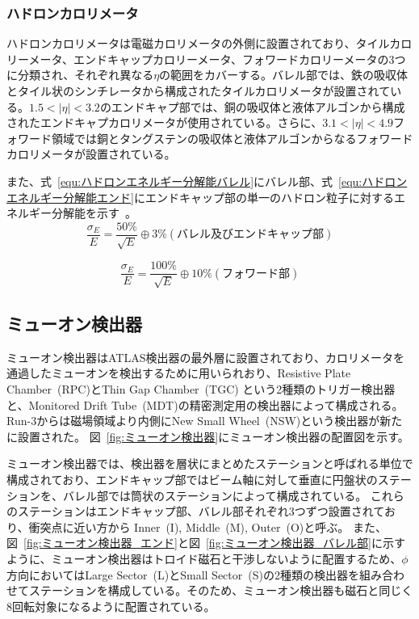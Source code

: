 \subsubsection{ハドロンカロリメータ}
ハドロンカロリメータは電磁カロリメータの外側に設置されており、タイルカロリーメータ、エンドキャップカロリーメータ、フォワードカロリーメータの3つに分類され、それぞれ異なる$\eta$の範囲をカバーする。バレル部では、鉄の吸収体とタイル状のシンチレータから構成されたタイルカロリメータが設置されている。$1.5 < |\eta| < 3.2$のエンドキャプ部では、銅の吸収体と液体アルゴンから構成されたエンドキャプカロリメータが使用されている。さらに、$3.1 < |\eta| < 4.9$フォワード領域では銅とタングステンの吸収体と液体アルゴンからなるフォワードカロリメータが設置されている。

また、式~\eqref{equ:ハドロンエネルギー分解能バレル}にバレル部、式~\eqref{equ:ハドロンエネルギー分解能エンド}にエンドキャップ部の単一のハドロン粒子に対するエネルギー分解能を示す~\cite{Aad:1129811}。
\begin{equation}
    \frac{\sigma_{E}}{E} = \frac{50 \%}{\sqrt{E}}\oplus 3 \%　(バレル及びエンドキャップ部)
　\label{equ:ハドロンエネルギー分解能バレル}
\end{equation}

\begin{equation}
    \frac{\sigma_{E}}{E} = \frac{100 \%}{\sqrt{E}}\oplus 10 \%　(フォワード部)
　\label{equ:ハドロンエネルギー分解能エンド}
\end{equation}

\subsection{ミューオン検出器}\label{section2-2-4}
ミューオン検出器はATLAS検出器の最外層に設置されており、カロリメータを通過したミューオンを検出するために用いられおり、Resistive Plate Chamber~(RPC)とThin Gap Chamber~(TGC) という2種類のトリガー検出器と、Monitored Drift Tube~(MDT)の精密測定用の検出器によって構成される。Run-3からは磁場領域より内側にNew Small Wheel~(NSW)という検出器が新たに設置された。
図~\ref{fig:ミューオン検出器}にミューオン検出器の配置図を示す。

ミューオン検出器では、検出器を層状にまとめたステーションと呼ばれる単位で構成されており、エンドキャップ部ではビーム軸に対して垂直に円盤状のステーションを、バレル部では筒状のステーションによって構成されている。
これらのステーションはエンドキャップ部、バレル部それぞれ3つずつ設置されており、衝突点に近い方から Inner~(I), Middle~(M), Outer~(O)と呼ぶ。
また、図~\ref{fig:ミューオン検出器_エンド}と図~\ref{fig:ミューオン検出器_バレル部}に示すように、ミューオン検出器はトロイド磁石と干渉しないように配置するため、$\phi$方向においてはLarge Sector~(L)とSmall Sector~(S)の2種類の検出器を組み合わせてステーションを構成している。そのため、ミューオン検出器も磁石と同じく8回転対象になるように配置されている。


